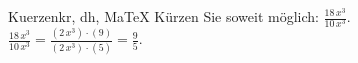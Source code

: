 \begin{MAufgabe}{Kuerzen}{kr, dh, MaTeX}
K\"urzen Sie soweit m\"oglich: $\frac{18\, x^3}{10\, x^3}$.\\ 
\ifLsg\MLoesung
\quad $\frac{18\, x^3}{10\, x^3}=\frac{(2\, x^3)\cdot(9)}{(2\, x^3)\cdot(5)}=\frac{9}{5}$.\else\relax\fi
 \end{MAufgabe}